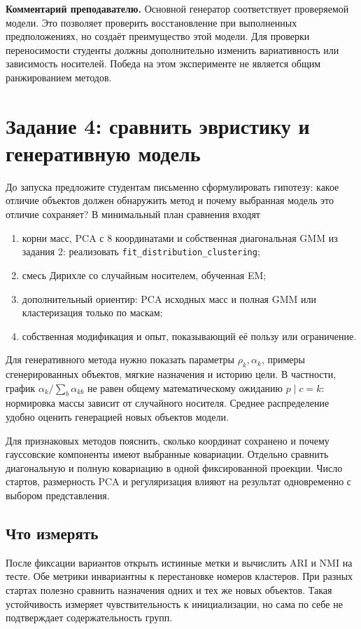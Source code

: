 \documentclass[11pt,a4paper]{article}
\newcommand{\teach}[1]{\par\textbf{Комментарий преподавателю.} #1\par}
\begin{document}
\teach{Основной генератор соответствует проверяемой модели.
Это позволяет проверить восстановление при выполненных предположениях,
но создаёт преимущество этой модели. Для проверки переносимости студенты
должны дополнительно изменить вариативность или зависимость носителей.
Победа на этом эксперименте не является общим ранжированием методов.}
\FloatBarrier

\section{Задание 4: сравнить эвристику и генеративную модель}

До запуска предложите студентам письменно сформулировать гипотезу:
какое отличие объектов должен обнаружить метод и почему выбранная модель
это отличие сохраняет? В минимальный план сравнения входят
\begin{enumerate}
\item корни масс, PCA с 8 координатами и собственная диагональная GMM
из задания 2: реализовать \texttt{fit\_distribution\_clustering};
\item смесь Дирихле со случайным носителем, обученная EM;
\item дополнительный ориентир: PCA исходных масс и полная GMM
или кластеризация только по маскам;
\item собственная модификация и опыт, показывающий её пользу или ограничение.
\end{enumerate}
Для генеративного метода нужно показать параметры $\rho_k,\alpha_k$, примеры
сгенерированных объектов, мягкие назначения и историю цели. В частности,
график $\alpha_k/\sum_b\alpha_{kb}$ не равен общему математическому
ожиданию $p\mid c=k$: нормировка массы зависит от случайного носителя.
Среднее распределение удобно оценить генерацией новых объектов модели.

Для признаковых методов пояснить, сколько координат сохранено и почему
гауссовские компоненты имеют выбранные ковариации. Отдельно сравнить
диагональную и полную ковариацию в одной фиксированной проекции.
Число стартов, размерность PCA и регуляризация влияют на результат
одновременно с выбором представления.

\subsection{Что измерять}
После фиксации вариантов открыть истинные метки и вычислить ARI и NMI
на тесте. Обе метрики инвариантны к перестановке номеров кластеров.
При разных стартах полезно сравнить назначения одних и тех же новых
объектов. Такая устойчивость измеряет чувствительность к инициализации,
но сама по себе не подтверждает содержательность групп.
\end{document}
